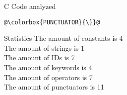 \documentclass{beamer} %
\begin{document}
\begin{frame}[fragile]{C Code analyzed}
	\begin{flushleft}
		\begin{lstlisting}[breaklines]
@\colorbox{PUNCTUATOR}{\}}@
		\end{lstlisting}
	\end{flushleft}
\end{frame}

\begin{frame}{Statistics}
The amount of constants is 4\\
The amount of strings is 1\\
The amount of IDs is 7\\
The amount of keywords is 4\\
The amount of operators is 7\\
The amount of punctuators is 11\\
\end{frame}
\end{document}
